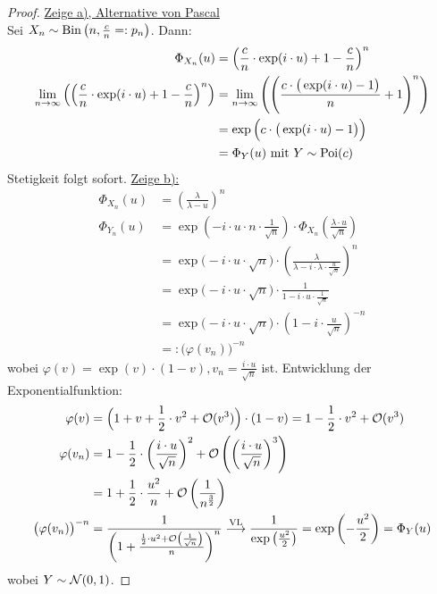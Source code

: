 \documentclass[12pt,a4paper]{article}
\begin{document}
\begin{proof}
	\underline{Zeige a), Alternative von Pascal}\\
	Sei $X_n\sim\operatorname{Bin}\left(n,\frac{c}{n}=:p_n\right)$.
	Dann:
	\begin{align*}
		\Phi_{X_n}(u)
		&=\left(\frac{c}{n}\cdot\exp(i\cdot u)+1-\frac{c}{n}\right)^n\\
		\lim\limits_{n\to\infty}\left(\left(\frac{c}{n}\cdot\exp(i\cdot u)+1-\frac{c}{n}\right)^n\right)
		&=\lim\limits_{n\to\infty}\left(\left(\frac{c\cdot\big(\exp(i\cdot u)-1\big)}{n}+1\right)^n\right)\\
		&=\exp\Big(c\cdot\big(\exp(i\cdot u)-1\big)\Big)\\
		&=\Phi_Y(u)\text{ mit } Y\sim\operatorname{Poi}(c)
	\end{align*}
	Stetigkeit folgt sofort.\nl
	\underline{Zeige b):}
	\begin{align*}
		\Phi_{X_n}(u)
		&=\left(\frac{\lambda}{\lambda-u}\right)^n\\
		\Phi_{Y_n}(u)
		&=\exp\left(-i\cdot u\cdot n\cdot\frac{1}{\sqrt{n}}\right)\cdot\Phi_{X_n}\left(\frac{\lambda\cdot u}{\sqrt{n}}\right)\\
		&=\exp\big(-i\cdot u\cdot\sqrt{n})\cdot\left(\frac{\lambda}{\lambda-i\cdot\lambda\cdot\frac{u}{\sqrt{n}}}\right)^n\\
		&=\exp\big(-i\cdot u\cdot\sqrt{n}\big)\cdot\frac{1}{1-i\cdot u\cdot\frac{1}{\sqrt{n}}}\\
		&=\exp\big(-i\cdot u\cdot\sqrt{n}\big)\cdot\left(1-i\cdot\frac{u}{\sqrt{n}}\right)^{-n}\\
		&=:\big(\varphi(v_n)\big)^{-n}
	\end{align*}
	wobei $\varphi(v)=\exp(v)\cdot(1-v),v_n=\frac{i\cdot u}{\sqrt{n}}$ ist.
	Entwicklung der Exponentialfunktion:
	\begin{align*}
		\varphi(v)
		&=\Big(1+v+\frac{1}{2}\cdot v^2+\mathcal{O}(v^3)\Big)\cdot(1-v)
		=1-\frac{1}{2}\cdot v^2+\mathcal{O}(v^3)\\
		\varphi(v_n)
		&=1-\frac{1}{2}\cdot\left(\frac{i\cdot u}{\sqrt{n}}\right)^2+\mathcal{O}\left(\left(\frac{i\cdot u}{\sqrt{n}}\right)^3\right)\\
		&=1+\frac{1}{2}\cdot\frac{u^2}{n}+\mathcal{O}\left(\frac{1}{n^{\frac{3}{2}}}\right)\\
		\big(\varphi(v_n)\big)^{-n}
		&=\frac{1}{\left(1+\frac{\frac{1}{2}\cdot u^2+\mathcal{O}\left(\frac{1}{\sqrt{n}}\right)}{n}\right)^n}
		\overset{\text{VL}}{\longrightarrow}
		\frac{1}{\exp\left(\frac{u^2}{2}\right)}=\exp\left(-\frac{u^2}{2}\right)=\Phi_Y(u)
	\end{align*}
	wobei $Y\sim\mathcal{N}(0,1)$.
	
	
\end{proof}
\end{document}
